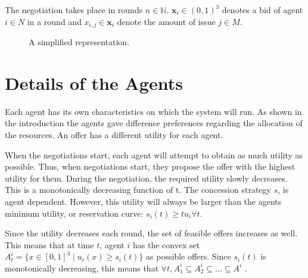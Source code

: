 The negotiation takes place in rounds $n\in \mathbb{N} $. $\mathbf{x}_i \in (0,1)^3$ denotes a bid of agent $i \in N$ in a round and $x_{i,j}\in \mathbf{x}_i$  denote the amount of issue $j \in M$.



\begin{figure}
	\centering
	\caption{A simplified representation.}
	\label{fig:agent-plant}
\end{figure}



\section{Details of the Agents}
Each agent has its own characteristics on which the system will run. As shown in the introduction the agents gave difference preferences regarding the allocation of the resources. An offer has a different utility for each agent. 

When the negotiations start, each agent will attempt to obtain as much utility as possible. Thus, when negotiations start, they propose the offer with the highest utility for them. During the negotiation, the required utility slowly decreases. This is a monotonically decreasing function of t. The concession strategy $s$, is agent dependent. However, this utility will always be larger than the agents minimum utility, or reservation curve: $s_i(t) \geq tu_i\forall t$.

Since the utility decreases each round, the set of feasible offers increases as well. This means that at time $t$, agent $i$ has the convex set $A^i_t = \{x\in [0,1]^3 \mid u_i(x) \geq s_i(t)   \}$ as possible offers. Since $s_i(t)$ is monotonically decreasing, this means that $\forall t, A^i_1\subseteq A^i_2 \subseteq ... \subseteq A^i$ .

